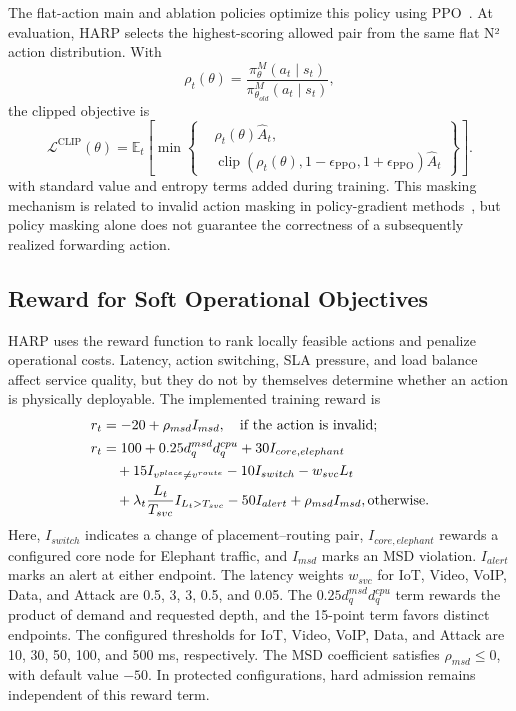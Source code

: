 \documentclass[final,5p]{elsarticle}
\newcommand{\rev}[1]{\textcolor{revisiongreen}{#1}}
\let\newrev\rev
\begin{document}
\sloppy
\newrev{The flat-action main and ablation policies optimize this policy using PPO~\cite{schulman2017proximal}. At evaluation, HARP selects the highest-scoring allowed pair from the same flat N² action distribution.} With
\begin{equation}
    \rho_t(\theta)=
    \frac{\pi_\theta^{M}(a_t\mid s_t)}
    {\pi_{\theta_{old}}^{M}(a_t\mid s_t)},
\end{equation}
the clipped objective is
\begin{equation} \label{eq:ppo_clip} \mathcal{L}^{\mathrm{CLIP}}(\theta) = \mathbb{E}_t \left[ \min \left\{ \begin{aligned} &\rho_t(\theta)\hat{A}_t,\\ &\operatorname{clip}\!\left( \rho_t(\theta), 1-\epsilon_{\mathrm{PPO}}, 1+\epsilon_{\mathrm{PPO}} \right)\hat{A}_t \end{aligned} \right\} \right]. \end{equation}
with standard value and entropy terms added during training. This masking mechanism is related to invalid action masking in policy-gradient methods~\cite{huang2022closer}, \rev{but policy masking alone does not guarantee the correctness of a subsequently realized forwarding action}.

\subsection{Reward for Soft Operational Objectives}
\label{subsec:harp_penalty}

HARP uses the reward function \rev{to rank locally feasible actions and penalize operational costs}. Latency, \rev{action switching}, SLA pressure, and load balance affect service quality, but they do not by themselves determine whether an action is physically deployable. \rev{The implemented training reward is}
\begin{equation}
\rev{\begin{aligned}
r_t&=-20+\rho_{msd}I_{msd}, \quad \text{if the action is invalid};\\
r_t&=100+0.25d_q^{msd}d_q^{cpu}+30I_{core,elephant}\\
&\quad+15I_{v^{place}\ne v^{route}}-10I_{switch}-w_{svc}L_t\\
&\quad+\lambda_t\frac{L_t}{T_{svc}}I_{L_t>T_{svc}}-50I_{alert}+\rho_{msd}I_{msd}, \text{otherwise}.
\end{aligned}}
\label{eq:harp_reward}
\end{equation}
\rev{Here, \(I_{switch}\) indicates a change of placement--routing pair, \(I_{core,elephant}\) rewards a configured core node for Elephant traffic, and \(I_{msd}\) marks an MSD violation. \(I_{alert}\) marks an alert at either endpoint. The latency weights \(w_{svc}\) for IoT, Video, VoIP, Data, and Attack are 0.5, 3, 3, 0.5, and 0.05. The \(0.25d_q^{msd}d_q^{cpu}\) term rewards the product of demand and requested depth, and the 15-point term favors distinct endpoints. The configured thresholds for IoT, Video, VoIP, Data, and Attack are 10, 30, 50, 100, and 500 ms, respectively. The MSD coefficient satisfies \(\rho_{msd}\le0\), with default value \(-50\). In protected configurations, hard admission remains independent of this reward term.}
\end{document}
